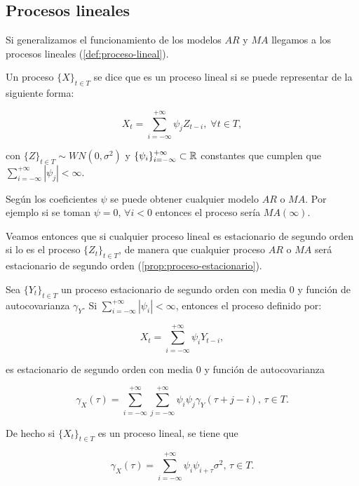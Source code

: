 \subsection{Procesos lineales}

Si generalizamos el funcionamiento de los modelos $AR$ y $MA$ llegamos a los procesos lineales (\autoref{def:proceso-lineal}).

\begin{definicion}
  Un proceso $\{X\}_{t \in T}$ se dice que es un proceso lineal si se puede representar de la siguiente forma:

  $$X_t = \sum \limits^{+\infty}_{i = -\infty} \psi_{j} Z_{t - i}, \; \forall t \in T,$$

  con $\{Z\}_{t \in T} \sim WN(0, \sigma^2)$ y $\{\psi_i\}^{+\infty}_{i = -\infty} \subset \mathbb{R}$ constantes que cumplen que $\sum \limits^{+\infty}_{i = -\infty} |\psi_j| < \infty$.
  \label{def:proceso-lineal}
\end{definicion}

Según los coeficientes $\psi$ se puede obtener cualquier modelo $AR$ o $MA$. Por ejemplo si se toman $\psi = 0, \, \forall i < 0$ entonces el proceso sería $MA(\infty)$.

Veamos entonces que si cualquier proceso lineal es estacionario de segundo orden si lo es el proceso $\{Z_t\}_{t \in T}$, de manera que cualquier proceso $AR$ o $MA$ será estacionario de segundo orden (\autoref{prop:proceso-estacionario}).

\begin{proposicion}
  Sea $\{Y_t\}_{t \in T}$ un proceso estacionario de segundo orden con media 0 y función de autocovarianza $\gamma_Y$. Si $\sum_{i = -\infty}^{+\infty} |\psi_i| < \infty$, entonces el proceso definido por:

  $$X_t = \sum \limits^{+\infty}_{i = -\infty} \psi_i Y_{t - i},$$

  es estacionario de segundo orden con media 0 y función de autocovarianza

  $$\gamma_X(\tau)= \sum \limits^{+\infty}_{i=-\infty}\sum \limits^{+\infty}_{j = -\infty} \psi_i \psi_j \gamma_Y(\tau + j - i), \, \tau \in T.$$

  De hecho si $\{X_t\}_{t \in T}$ es un proceso lineal, se tiene que

  $$\gamma_X(\tau) = \sum \limits^{+\infty}_{i = -\infty} \psi_{i} \psi_{i + \tau}\sigma^2, \, \tau \in T.$$
  \label{prop:proceso-estacionario}
\end{proposicion}

